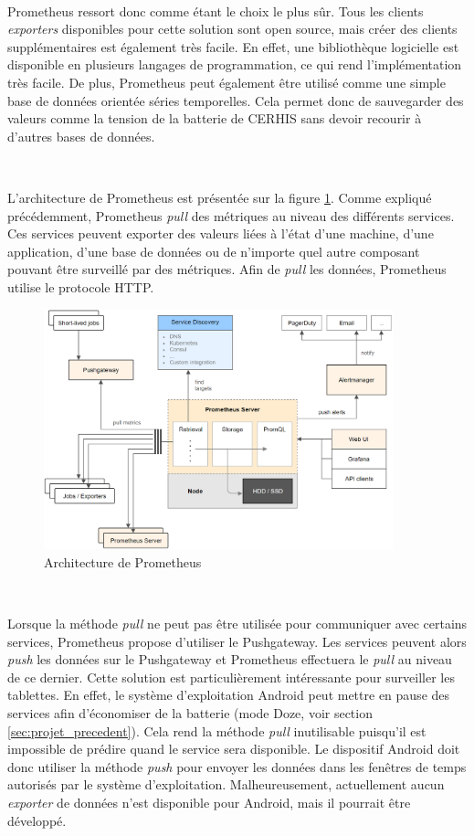 ~

\noindent
Prometheus ressort donc comme étant le choix le plus sûr. Tous les clients \textit{exporters} disponibles pour cette solution sont open source, mais créer des clients supplémentaires est également très facile. En effet, une bibliothèque logicielle est disponible en plusieurs langages de programmation, ce qui rend l'implémentation très facile. De plus, Prometheus peut également être utilisé comme une simple base de données orientée séries temporelles. Cela permet donc de sauvegarder des valeurs comme la tension de la batterie de CERHIS sans devoir recourir à d'autres bases de données.

~

\noindent
L'architecture de Prometheus est présentée sur la figure \ref{fig:prom_arch}. Comme expliqué précédemment, Prometheus \textit{pull} des métriques au niveau des différents services. Ces services peuvent exporter des valeurs liées à l'état d'une machine, d'une application, d'une base de données ou de n'importe quel autre composant pouvant être surveillé par des métriques. Afin de \textit{pull} les données, Prometheus utilise le protocole HTTP.

\begin{figure}[ht!]
  \centering
  \includegraphics[width=0.9\textwidth]{img/app/prom_arch.png}
  \caption{Architecture de Prometheus}
  \label{fig:prom_arch}
\end{figure}

~

\noindent
Lorsque la méthode \textit{pull} ne peut pas être utilisée pour communiquer avec certains services, Prometheus propose d'utiliser le Pushgateway. Les services peuvent alors \textit{push} les données sur le Pushgateway et Prometheus effectuera le \textit{pull} au niveau de ce dernier. Cette solution est particulièrement intéressante pour surveiller les tablettes. En effet, le système d'exploitation Android peut mettre en pause des services afin d'économiser de la batterie (mode Doze, voir section \ref{sec:projet_precedent}). Cela rend la méthode \textit{pull} inutilisable puisqu'il est impossible de prédire quand le service sera disponible. Le dispositif Android doit donc utiliser la méthode \textit{push} pour envoyer les données dans les fenêtres de temps autorisés par le système d'exploitation. Malheureusement, actuellement aucun \textit{exporter} de données n'est disponible pour Android, mais il pourrait être développé.

